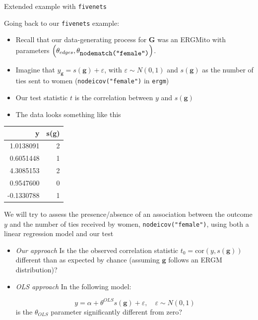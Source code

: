 \documentclass[10pt,ignorenonframetext,aspectratio=169,]{beamer}
\newcommand{\sufstats}[1]{s\left(#1\right)}
\newcommand{\Graph}{\mathbf{G}}
\newcommand{\graph}{\mathbf{g}}
\newcommand{\depvar}{y}
\begin{document}
\begin{frame}[fragile]{Extended example with \texttt{fivenets}}
\protect\hypertarget{extended-example-with-fivenets}{}

\scriptsize

\normalsize

Going back to our \texttt{fivenets} example: \pause

\begin{itemize}
\item
  Recall that our data-generating process for \(\Graph\) was an ERGMito
  with parameters
  \(\left(\theta_{edges}, \theta_{\mbox{\texttt{nodematch("female")}}}\right)\).\pause
\item
  Imagine that \(\depvar_\graph = \sufstats{\graph} + \varepsilon\),
  with \(\varepsilon\sim N(0,1)\) and \(\sufstats{\graph}\) as the
  number of ties sent to women (\texttt{nodeicov("female")} in
  \texttt{ergm})\pause
\item
  Our test statistic \(t\) is the correlation between \(\depvar\) and
  \(\sufstats{\graph}\)\pause
\item
  The data looks something like this\pause
\end{itemize}

\scriptsize

\begin{longtable}[]{@{}rr@{}}
\toprule
y & s(g)\tabularnewline
\midrule
\endhead
1.0138091 & 2\tabularnewline
0.6051448 & 1\tabularnewline
4.3085153 & 2\tabularnewline
0.9547600 & 0\tabularnewline
-0.1330788 & 1\tabularnewline
\bottomrule
\end{longtable}

\normalsize

\end{frame}

\begin{frame}[fragile]

We will try to assess the presence/absence of an association between the
outcome \(\depvar\) and the number of ties received by women,
\texttt{nodeicov("female")}, using both a linear regression model and
our test\pause

\begin{itemize}
\item
  \emph{Our approach} Is the the observed correlation statistic
  \(t_0 = \mbox{cor}\left(y, \sufstats{\graph}\right)\) different than
  as expected by chance (assuming \(\graph\) follows an ERGM
  distribution)?\pause
\item
  \emph{OLS approach} In the following model:\pause

  \[
  \depvar = \alpha + \theta^{OLS}\sufstats{\graph} + \varepsilon,\quad\varepsilon\sim N(0,1)
  \] is the \(\theta_{OLS}\) parameter significantly different from
  zero?
\end{itemize}

\end{frame}
\end{document}
